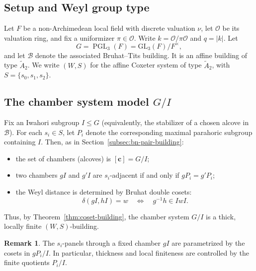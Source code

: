 \documentclass[11pt]{amsart}
\theoremstyle{definition}
\newtheorem{remark}[thm]{Remark}
\theoremstyle{remark}
\numberwithin{equation}{section}
\begin{document}
\subsection{Setup and Weyl group type}\label{subsec:pgl3-setup}

Let $F$ be a non-Archimedean local field with discrete valuation $\nu$,
let $\mathcal{O}$ be its valuation ring, and fix a uniformizer $\pi\in\mathcal{O}$.
Write $k=\mathcal{O}/\pi\mathcal{O}$ and $q=|k|$.
Let
\[
G=\operatorname{PGL}_3(F)=\mathrm{GL}_3(F)/F^\times,
\]
and let $\mathcal{B}$ denote the associated Bruhat--Tits building.
It is an affine building of type $\widetilde{A}_2$.
We write $(W,S)$ for the affine Coxeter system of type $\widetilde{A}_2$,
with $S=\{s_0,s_1,s_2\}$.

\subsection{The chamber system model \texorpdfstring{$G/I$}{G/I}}\label{subsec:GI-model}

Fix an Iwahori subgroup $I\le G$ (equivalently, the stabilizer of a chosen alcove in $\mathcal{B}$).
For each $s_i\in S$, let $P_i$ denote the corresponding maximal parahoric subgroup containing $I$.
Then, as in Section~\ref{subsec:bn-pair-building}:

\begin{itemize}
\item the set of chambers (alcoves) is $[\mathbf{c}]=G/I$;
\item two chambers $gI$ and $g'I$ are $s_i$-adjacent if and only if $gP_i=g'P_i$;
\item the Weyl distance is determined by Bruhat double cosets:
\[
\delta(gI,hI)=w \quad \Longleftrightarrow \quad g^{-1}h\in IwI.
\]
\end{itemize}

Thus, by Theorem~\ref{thm:coset-building}, the chamber system $G/I$ is a thick, locally finite $(W,S)$-building.

\begin{remark}\label{rem:panels-as-parahoric-cosets}
The $s_i$-panels through a fixed chamber $gI$ are parametrized by the cosets in $gP_i/I$.
In particular, thickness and local finiteness are controlled by the finite quotients $P_i/I$.
\end{remark}
\end{document}
